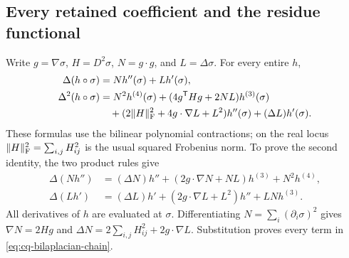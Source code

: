 \subsection{Every retained coefficient and the residue functional}
Write $g=\nabla\sigma$, $H=D^2\sigma$, $N=g\cdot g$,
and $L=\Delta\sigma$. For every entire $h$,
\begin{align}
 \Delta(h\circ\sigma)&=Nh''(\sigma)+Lh'(\sigma),\notag\\
 \Delta^2(h\circ\sigma)&=
 N^2h^{(4)}(\sigma)+(4g^{\mathsf T}Hg+2NL)h^{(3)}(\sigma)\notag\\
 &\quad+(2\|H\|_{\rm F}^2+4g\cdot\nabla L+L^2)h''(\sigma)
       +(\Delta L)h'(\sigma).
 \label{eq:cq-bilaplacian-chain}
\end{align}
These formulas use the bilinear polynomial contractions; on the
real locus $\|H\|_{\rm F}^2=\sum_{i,j}H_{ij}^2$ is the usual
squared Frobenius norm. To prove the second identity, the two
product rules give
\begin{align*}
 \Delta(Nh'')&=(\Delta N)h''+
   (2g\cdot\nabla N+NL)h^{(3)}+N^2h^{(4)},\\
 \Delta(Lh')&=(\Delta L)h'+
   (2g\cdot\nabla L+L^2)h''+LN h^{(3)}.
\end{align*}
All derivatives of $h$ are evaluated at $\sigma$. Differentiating
$N=\sum_i(\partial_i\sigma)^2$ gives
$\nabla N=2Hg$ and
$\Delta N=2\sum_{i,j}H_{ij}^2+2g\cdot\nabla L$.
Substitution proves every term in
\eqref{eq:cq-bilaplacian-chain}.

